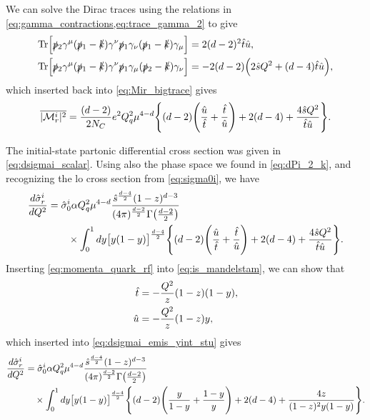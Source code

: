 We can solve the Dirac traces using the relations in \cref{eq:gamma_contractions,eq:trace_gamma_2} to give
\begin{subequations}
\begin{align}
    \operatorname{Tr}\Bigl[ \slashed{p}{}_2\gamma^\mu(\slashed{p}{}_1-\slashed{k})\gamma^\nu\slashed{p}{}_1\gamma_\nu(\slashed{p}{}_1-\slashed{k})\gamma_\mu \Bigr]
    &= 2(d-2)^2 \hat{t}\hat{u},
    \\
    \operatorname{Tr}\Bigl[ \slashed{p}{}_2\gamma^\mu(\slashed{p}{}_1-\slashed{k})\gamma^\nu\slashed{p}{}_1\gamma_\mu(\slashed{p}{}_2-\slashed{k})\gamma_\nu \Bigr]
    &= -2(d-2) \Bigl( 2\hat{s} Q^2 + (d-4)\hat{t}\hat{u} \Bigr),
\end{align}
\end{subequations}
which inserted back into \cref{eq:Mir_bigtrace} gives
\begin{equation}
    \overline{\lvert\mathcal{M}^i_r\rvert^2} = \frac{(d-2)}{2N_C} e^2 Q_q^2 \mu^{4-d}
    \Biggl\{ (d-2) \Biggl( \frac{\hat{u}}{\hat{t}} + \frac{\hat{t}}{\hat{u}} \Biggr) + 2(d-4) + \frac{4\hat{s} Q^2}{\hat{t}\hat{u}} \Biggr\}.
\end{equation}

The initial-state partonic differential cross section was given in \cref{eq:dsigmai_scalar}. Using also the phase space we found in \cref{eq:dPi_2_k}, and recognizing the \gls{lo} cross section from \cref{eq:sigma0i}, we have
\begin{align}
\begin{split}
    \frac{d\hat{\sigma}^i_r}{dQ^2}
    &=
    \hat\sigma^i_0
    \alpha Q_q^2 \mu^{4-d}
    \frac{\hat{s}^{\frac{d-4}{2}}(1-z)^{d-3}}{(4\pi)^{\frac{d-2}{2}} \Gamma\bigl(\frac{d-2}{2}\bigr)}
    \\ &\qquad \times
    \int_0^1 dy \bigl[y(1-y)\bigr]^{\frac{d-4}{2}}
    \Biggl\{ (d-2) \Biggl( \frac{\hat{u}}{\hat{t}} + \frac{\hat{t}}{\hat{u}} \Biggr) + 2(d-4) + \frac{4\hat{s} Q^2}{\hat{t}\hat{u}} \Biggr\}.
\end{split}
\label{eq:dsigmai_emis_yint_stu}
\end{align}
Inserting \cref{eq:momenta_quark_rf} into \cref{eq:is_mandelstam}, we can show that
\begin{subequations}
\begin{align}
    \hat{t} &= -\frac{Q^2}{z}(1-z)(1-y),
    \\
    \hat{u} &= -\frac{Q^2}{z}(1-z)y,
\end{align}
\end{subequations}
which inserted into \cref{eq:dsigmai_emis_yint_stu} gives
\begin{equation}
\begin{split}
    \frac{d\hat{\sigma}^i_r}{dQ^2}
    &=
    \hat\sigma^i_0
    \alpha Q_q^2 \mu^{4-d}
    \frac{\hat{s}^{\frac{d-4}{2}}(1-z)^{d-3}}{(4\pi)^{\frac{d-2}{2}} \Gamma\bigl(\frac{d-2}{2}\bigr)}
    \\ &\quad \times
    \int_0^1 dy \bigl[y(1-y)\bigr]^{\frac{d-4}{2}}
    \Biggl\{ (d-2) \Biggl( \frac{y}{1-y} + \frac{1-y}{y} \Biggr) + 2(d-4) + \frac{4z}{(1-z)^2y(1-y)} \Biggr\}.
\end{split}
\label{eq:dsigmai_emis_yint}
\end{equation}

